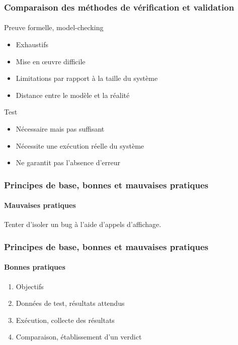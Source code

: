 \documentclass{beamer}
\begin{document}
\begin{frame}
	\frametitle{Comparaison des m\'{e}thodes de v\'{e}rification et validation}
	\framesubtitle{}
	
		Preuve formelle, model-checking
		\begin{itemize}
			\item Exhaustifs
			\item Mise en \oe{}uvre difficile
			\item Limitations par rapport \`{a} la taille du syst\`{e}me
			\item Distance entre le mod\`{e}le et la r\'{e}alit\'{e}
		\end{itemize}
		
		\bigskip
		
		Test
		\begin{itemize}
			\item N\'{e}cessaire mais pas suffisant
			\item N\'{e}cessite une ex\'{e}cution r\'{e}elle du syst\`{e}me
			\item Ne garantit pas l'absence d'erreur
		\end{itemize}
\end{frame}	


\begin{frame}
	\frametitle{Principes de base, bonnes et mauvaises pratiques}
	\framesubtitle{Mauvaises pratiques}
		
	Tenter d'isoler un bug \`{a} l'aide d'appels d'affichage.

\end{frame}

\begin{frame}
	\frametitle{Principes de base, bonnes et mauvaises pratiques}
	\framesubtitle{Bonnes pratiques}
		\begin{enumerate}
			\item Objectifs
			\item Donn\'{e}es de test, r\'{e}sultats attendus
			\item Ex\'{e}cution, collecte des r\'{e}sultats
			\item Comparaison, \'{e}tablissement d'un verdict
		\end{enumerate}
\end{frame}	
	
\end{document}
